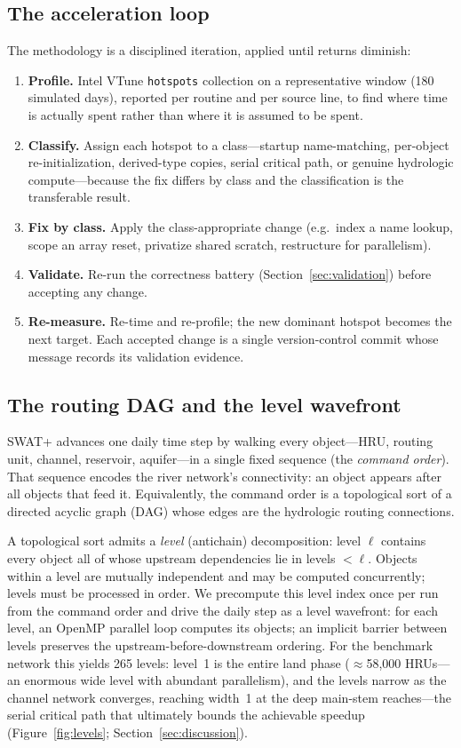 \subsection{The acceleration loop}
The methodology is a disciplined iteration, applied until returns diminish:
\begin{enumerate}
  \item \textbf{Profile.} Intel VTune \texttt{hotspots} collection on a representative window
        (180 simulated days), reported per routine and per source line, to find where time is
        actually spent rather than where it is assumed to be spent.
  \item \textbf{Classify.} Assign each hotspot to a class---startup name-matching, per-object
        re-initialization, derived-type copies, serial critical path, or genuine hydrologic
        compute---because the fix differs by class and the classification is the transferable
        result.
  \item \textbf{Fix by class.} Apply the class-appropriate change (e.g.\ index a name lookup,
        scope an array reset, privatize shared scratch, restructure for parallelism).
  \item \textbf{Validate.} Re-run the correctness battery (Section~\ref{sec:validation})
        before accepting any change.
  \item \textbf{Re-measure.} Re-time and re-profile; the new dominant hotspot becomes the next
        target. Each accepted change is a single version-control commit whose message records
        its validation evidence.
\end{enumerate}

\subsection{The routing DAG and the level wavefront}\label{sec:wavefront}
SWAT+ advances one daily time step by walking every object---HRU, routing unit, channel,
reservoir, aquifer---in a single fixed sequence (the \emph{command order}). That sequence
encodes the river network's connectivity: an object appears after all objects that feed it.
Equivalently, the command order is a topological sort of a directed acyclic graph (DAG) whose
edges are the hydrologic routing connections.

A topological sort admits a \emph{level} (antichain) decomposition: level $\ell$ contains
every object all of whose upstream dependencies lie in levels $<\ell$. Objects within a level
are mutually independent and may be computed concurrently; levels must be processed in order.
We precompute this level index once per run from the command order and drive the daily step
as a level wavefront: for each level, an OpenMP parallel loop computes its objects; an
implicit barrier between levels preserves the upstream-before-downstream ordering. For the
benchmark network this yields 265 levels: level~1 is the entire land phase
($\approx$58{,}000 HRUs---an enormous wide level with abundant parallelism), and the levels
narrow as the channel network converges, reaching width~1 at the deep main-stem
reaches---the serial critical path that ultimately bounds the achievable speedup
(Figure~\ref{fig:levels}; Section~\ref{sec:discussion}).

